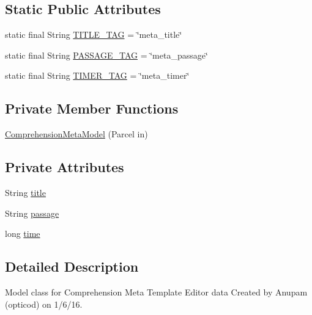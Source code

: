 \subsection*{Static Public Attributes}
\begin{DoxyCompactItemize}
\item 
static final String \hyperlink{classorg_1_1buildmlearn_1_1comprehension_1_1data_1_1ComprehensionMetaModel_a0262e00ac9c06cb3be649762be3323b5}{T\+I\+T\+L\+E\+\_\+\+T\+AG} = \char`\"{}meta\+\_\+title\char`\"{}
\item 
static final String \hyperlink{classorg_1_1buildmlearn_1_1comprehension_1_1data_1_1ComprehensionMetaModel_a6d9869a0ddfba92452b104dbf3077533}{P\+A\+S\+S\+A\+G\+E\+\_\+\+T\+AG} = \char`\"{}meta\+\_\+passage\char`\"{}
\item 
static final String \hyperlink{classorg_1_1buildmlearn_1_1comprehension_1_1data_1_1ComprehensionMetaModel_ae53e4612b6c50f2fa0840d70e1401123}{T\+I\+M\+E\+R\+\_\+\+T\+AG} = \char`\"{}meta\+\_\+timer\char`\"{}
\end{DoxyCompactItemize}
\subsection*{Private Member Functions}
\begin{DoxyCompactItemize}
\item 
\hyperlink{classorg_1_1buildmlearn_1_1comprehension_1_1data_1_1ComprehensionMetaModel_a48f995f55ad07846469498fab722e881}{Comprehension\+Meta\+Model} (Parcel in)
\end{DoxyCompactItemize}
\subsection*{Private Attributes}
\begin{DoxyCompactItemize}
\item 
String \hyperlink{classorg_1_1buildmlearn_1_1comprehension_1_1data_1_1ComprehensionMetaModel_a7477c70ed310977d2940c96e79102c6d}{title}
\item 
String \hyperlink{classorg_1_1buildmlearn_1_1comprehension_1_1data_1_1ComprehensionMetaModel_a1428aaa8205ac28da21b07937d134b3a}{passage}
\item 
long \hyperlink{classorg_1_1buildmlearn_1_1comprehension_1_1data_1_1ComprehensionMetaModel_a33312b86ddcb88ad1f4c150e9c033643}{time}
\end{DoxyCompactItemize}


\subsection{Detailed Description}
Model class for Comprehension Meta Template Editor data Created by Anupam (opticod) on 1/6/16. 

